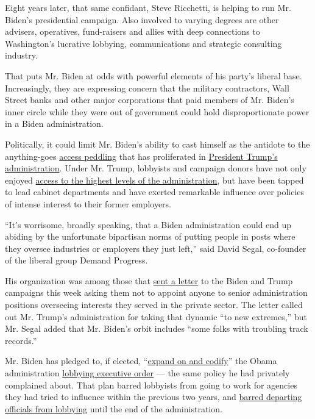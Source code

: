 Eight years later, that same confidant, Steve Ricchetti, is helping to
run Mr. Biden's presidential campaign. Also involved to varying degrees
are other advisers, operatives, fund-raisers and allies with deep
connections to Washington's lucrative lobbying, communications and
strategic consulting industry.

That puts Mr. Biden at odds with powerful elements of his party's
liberal base. Increasingly, they are expressing concern that the
military contractors, Wall Street banks and other major corporations
that paid members of Mr. Biden's inner circle while they were out of
government could hold disproportionate power in a Biden administration.

Politically, it could limit Mr. Biden's ability to cast himself as the
antidote to the anything-goes
\href{https://www.nytimes.com/2020/01/26/us/politics/trump-recording-donors.html}{access
peddling} that has proliferated in
\href{https://www.nytimes.com/2019/10/18/climate/trump-cabinet-lobbyists.html}{President
Trump's administration}. Under Mr. Trump, lobbyists and campaign donors
have not only enjoyed
\href{https://www.nytimes.com/2020/07/06/us/politics/trump-lobbyists-swamp-campaign.html}{access
to the highest levels of the administration}, but have been tapped to
lead cabinet departments and have exerted remarkable influence over
policies of intense interest to their former employers.

``It's worrisome, broadly speaking, that a Biden administration could
end up abiding by the unfortunate bipartisan norms of putting people in
posts where they oversee industries or employers they just left,'' said
David Segal, co-founder of the liberal group Demand Progress.

His organization was among those that
\href{https://therevolvingdoorproject.org/to-rebuild-public-trust-close-the-revolving-door/}{sent
a letter} to the Biden and Trump campaigns this week asking them not to
appoint anyone to senior administration positions overseeing interests
they served in the private sector. The letter called out Mr. Trump's
administration for taking that dynamic ``to new extremes,'' but Mr.
Segal added that Mr. Biden's orbit includes ``some folks with troubling
track records.''

Mr. Biden has pledged to, if elected,
``\href{https://joebiden.com/governmentreform/}{expand on and codify}''
the Obama administration
\href{https://www.oge.gov/web/oge.nsf/Executive\%20Orders/A70F962587DAC28F85257E96006A90F2/$FILE/23a5e4eeaffd4e14b4387b40b0eae5963.pdf?open}{lobbying
executive order} --- the same policy he had privately complained about.
That plan barred lobbyists from going to work for agencies they had
tried to influence within the previous two years, and
\href{https://www.nytimes.com/2009/01/22/us/politics/22obama.html}{barred
departing officials from lobbying} until the end of the administration.

